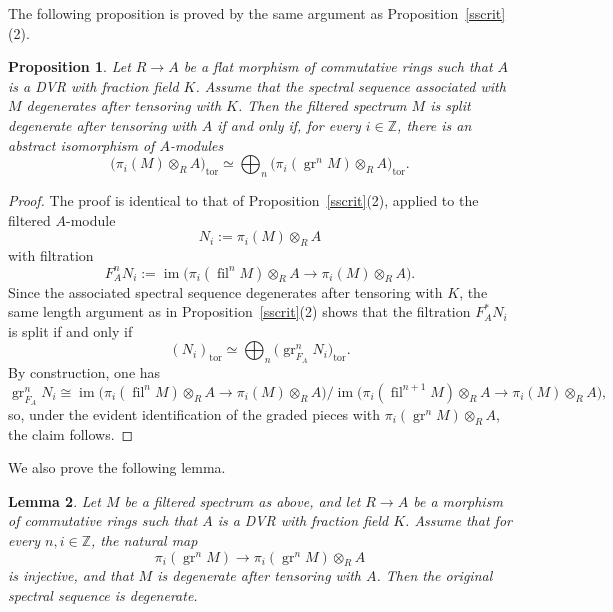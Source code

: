 \documentclass[11pt]{amsart}
\newtheorem{lemma}{Lemma}[section]
\newtheorem{proposition}[lemma]{Proposition}
\numberwithin{equation}{section}
\newcommand{\Z}{\mathbb{Z}}
\newcommand{\tors}{\operatorname{tor}}
\newcommand{\gr}{{\operatorname{gr}}}
\newcommand{\fil}{{\operatorname{fil}}}
\numberwithin{equation}{section}
\begin{document}
The following proposition is proved by the same argument as Proposition~\ref{sscrit}(2).

\begin{proposition}\label{sscritflat}
Let $R \to A$ be a flat morphism of commutative rings such that $A$ is a DVR with fraction field $K$. Assume that the spectral sequence associated with $M$ degenerates after tensoring with $K$. Then the filtered spectrum $M$ is split degenerate after tensoring with $A$ if and only if, for every $i\in\Z$, there is an abstract isomorphism of $A$-modules
\begin{equation*}
  \bigl( \pi_i(M)\otimes_R A \bigr)_{\tors}
  \simeq
  \bigoplus_n \bigl(\pi_i(\gr^nM)\otimes_R A \bigr)_{\tors}.
\end{equation*}
\end{proposition}

\begin{proof}
The proof is identical to that of Proposition~\ref{sscrit}(2), applied to the filtered $A$-module
\begin{equation*}
  N_i:=\pi_i(M)\otimes_R A
\end{equation*}
with filtration
\begin{equation*}
  F_A^nN_i:=
  \operatorname{im}\bigl(\pi_i(\fil^n M)\otimes_R A
  \to \pi_i(M)\otimes_R A\bigr).
\end{equation*}
Since the associated spectral sequence degenerates after tensoring with $K$, the same length argument as in Proposition~\ref{sscrit}(2) shows that the filtration $F_A^* N_i$ is split if and only if
\begin{equation*}
  (N_i)_{\tors}
  \simeq
  \bigoplus_n \bigl(\gr_{F_A}^n N_i\bigr)_{\tors}.
\end{equation*}
By construction, one has
\begin{equation*}
  \gr_{F_A}^n N_i
  \cong
  \operatorname{im}\bigl(\pi_i(\fil^n M)\otimes_R A
  \to \pi_i(M)\otimes_R A\bigr)
  \Big/
  \operatorname{im}\bigl(\pi_i(\fil^{n+1} M)\otimes_R A
  \to \pi_i(M)\otimes_R A\bigr),
\end{equation*}
so, under the evident identification of the graded pieces with
$\pi_i(\gr^n M)\otimes_R A$, the claim follows.
\end{proof}

We also prove the following lemma.

\begin{lemma}\label{degdetect}
Let $M$ be a filtered spectrum as above, and let $R \to A$ be a morphism of commutative rings such that $A$ is a DVR with fraction field $K$. Assume that for every $n,i\in \Z$, the natural map
\begin{equation*}
  \pi_i(\gr^n M)\longrightarrow \pi_i(\gr^n M)\otimes_R A
\end{equation*}
is injective, and that $M$ is degenerate after tensoring with $A$. Then the original spectral sequence is degenerate.
\end{lemma}
\end{document}
